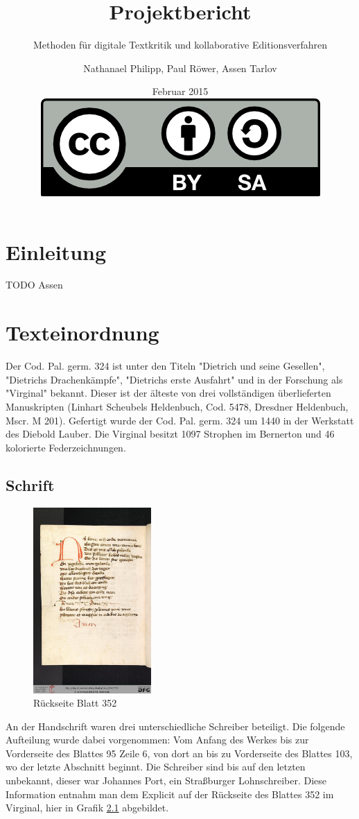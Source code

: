 \documentclass[a4paper, 12pt, oneside]{scrbook}
\author{Nathanael Philipp, Paul Röwer, Assen Tarlov}
\title{Projektbericht}
\subtitle{Methoden für digitale Textkritik und kollaborative Editionsverfahren}
\date{Februar 2015\\\vspace{20em}\includegraphics{by-sa.png}}
\begin{document}
\maketitle\newpage
\tableofcontents\newpage
\chapter{Einleitung}
TODO Assen

\chapter{Texteinordnung}
Der Cod. Pal. germ. 324 ist unter den Titeln "Dietrich und seine Gesellen", "Dietrichs Drachenkämpfe", "Dietrichs erste Ausfahrt" und in der Forschung als "Virginal" bekannt. Dieser ist der älteste von drei vollständigen überlieferten Manuskripten (Linhart Scheubels Heldenbuch, Cod. 5478, Dresdner Heldenbuch, Mscr. M 201). Gefertigt wurde der Cod. Pal. germ. 324 um 1440 in der Werkstatt des Diebold Lauber. Die Virginal besitzt 1097 Strophen im Bernerton und 46 kolorierte Federzeichnungen.\cite{ubheidelber_bibpal}

\section{Schrift}
\begin{figure}
	\vspace{-40pt}
	\centering
	\includegraphics[width=0.4\textwidth]{0722.jpg}
	\caption{Rückseite Blatt 352\cite{virginal352v}}
	\label{fig:1}
\end{figure}

An der Handschrift waren drei unterschiedliche Schreiber beteiligt. Die folgende Aufteilung wurde dabei vorgenommen: Vom Anfang des Werkes bis zur Vorderseite des Blattes 95 Zeile 6, von dort an bis zu Vorderseite des Blattes 103, wo der letzte Abschnitt beginnt. Die Schreiber sind bis auf den letzten unbekannt, dieser war Johannes Port, ein Straßburger Lohnschreiber. Diese Information entnahm man dem Explicit auf der Rückseite des Blattes 352 im Virginal, hier in Grafik \ref{fig:1} abgebildet.
\end{document}
